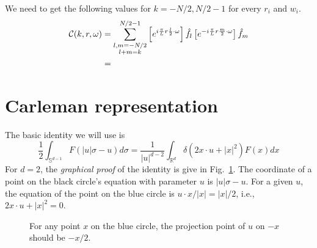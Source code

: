 \documentclass[11pt]{amsart}
\begin{document}
\color{black}
We need to get the following values for $k = -N/2, N/2-1$ for every $r_i$ and $w_i$. 
\begin{align}
\begin{split}
\mathcal{C}(k, r, \omega)  &= \sum_{\substack{l,m=-N/2\\l+m=k}}^{N/2-1} \left[ e^{i{\pi \over L} r {l\over 2}\cdot \omega } \right] \hat{f}_l  \left[ e^{-i{\pi \over L} r {m\over 2}\cdot \omega } \right] \hat{f}_m \\
&= 
\end{split}
\end{align}
 


\section{Carleman representation}

The basic identity we will use is 
\begin{equation}\label{identity} 
\frac{1}{2} \int_{\mathbb{S}^{d-1}} F(|u| \sigma-u) d \sigma=\frac{1}{|u|^{d-2}} \int_{\mathbb{R}^{d}} \delta\left(2 x \cdot u+|x|^{2}\right) F(x) d x
\end{equation}
For $d=2$, the \emph{graphical proof} of the identity is give in Fig.~\ref{fig:identity}. The coordinate of a point on the black circle's equation with parameter $u$ is $|u| \sigma-u$.  For a given $u$, the equation of the point on the blue circle is $ u\cdot x/|x| = |x|/2$, i.e., $2 x \cdot u+|x|^{2}= 0$. 

\begin{figure}[htbp]
\begin{center}
\caption{For any point $x$ on the blue circle, the projection point of $u$ on $-x$ should be $-x/2$.}
\label{fig:identity}
\end{center}
\end{figure}
\end{document}
